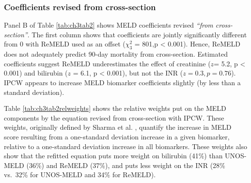 \documentclass[11pt,twoside,]{book}
\begin{document}
\subsubsection{Coefficients revised from cross-section}\label{coefficients-revised-from-cross-section}

Panel B of Table \ref{tab:ch3tab2} shows MELD coefficients revised \emph{``from
cross-section''}. The first column shows that coefficients are jointly
significantly different from 0 with ReMELD used as an offset
(\(\chi_{3}^{2}\) = 801,p \textless{} 0.001). Hence, ReMELD does not adequately
predict 90-day mortality from cross-section. Estimated coefficients
suggest ReMELD underestimates the effect of creatinine
(\(z\)= 5.2, p \textless{} 0.001) and bilirubin (\(z\) = 6.1, p \textless{} 0.001), but not
the INR (\(z = 0.3,p = 0.76\)). IPCW appears to increase MELD
biomarker coefficients slightly (by less than a standard deviation).

Table \ref{tab:ch3tab2relweights} shows the relative weights put on the MELD
components by the equation revised from cross-section with IPCW.
These weights, originally defined by Sharma et al. \citep{sharmaReweightingModelEndStage2008},
quantify the increase in MELD score resulting from a one-standard deviation increase
in a given biomarker, relative to a one-standard deviation increase in all biomarkers.
These weights also show that the refitted equation puts more weight on bilirubin (41\%)
than UNOS-MELD (36\%) and ReMELD (37\%), and puts less weight on the INR
(28\% vs.~32\% for UNOS-MELD and 34\% for ReMELD).

\begingroup
\setlength{\aboverulesep}{0.2ex}
\setlength{\belowrulesep}{0.3ex}
\end{document}

